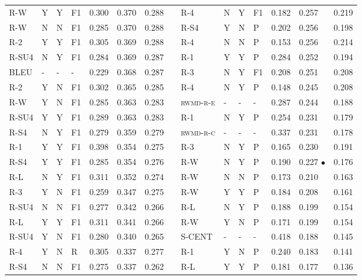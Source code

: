 \documentclass[11pt,a4paper]{article}
\begin{document}
\begin{table}[]
{\begin{tabular}{lllllllllllllll}
\textsc{R-W} & Y & Y & F1 & 0.300 & 0.370 & 0.288 &  & \textsc{R-4} & N & Y & F1 & 0.182 & 0.257 & 0.219 \\
\textsc{R-W} & N & N & F1 & 0.285 & 0.370 & 0.288 &  & \textsc{R-S4} & Y & N & P & 0.202 & 0.256 & 0.198 \\
\textsc{R-2} & Y & Y & F1 & 0.305 & 0.369 & 0.288 &  & \textsc{R-4} & N & N & P & 0.153 & 0.256 & 0.214 \\
\textsc{R-SU4} & N & Y & F1 & 0.284 & 0.369 & 0.287 &  & \textsc{R-1} & Y & Y & P & 0.284 & 0.252 & 0.194 \\
\textsc{BLEU} & - & - & - & 0.229 & 0.368 & 0.287 &  & \textsc{R-3} & N & Y & F1 & 0.208 & 0.251 & 0.208 \\
\textsc{R-2} & Y & N & F1 & 0.302 & 0.365 & 0.285 &  & \textsc{R-4} & N & Y & P & 0.148 & 0.245 & 0.208 \\
\textsc{R-W} & Y & N & F1 & 0.285 & 0.363 & 0.283 &  & \textsc{rwmd-r-e} & - & - & - & 0.287 & 0.244 & 0.188 \\
\textsc{R-SU4} & Y & Y & F1 & 0.289 & 0.363 & 0.283 &  & \textsc{R-1} & N & Y & P & 0.254 & 0.231 & 0.179 \\
\textsc{R-S4} & N & Y & F1 & 0.279 & 0.359 & 0.279 &  & \textsc{rwmd-r-c} & - & - & - & 0.337 & 0.231 & 0.178 \\
\textsc{R-1} & Y & Y & F1 & 0.398 & 0.354 & 0.275 &  & \textsc{R-3} & N & Y & P & 0.165 & 0.230 & 0.191 \\
\textsc{R-S4} & Y & Y & F1 & 0.285 & 0.354 & 0.276 &  & \textsc{R-W} & N & Y & P & 0.190 & 0.227 $\bullet$ & 0.176 \\
\textsc{R-L} & N & Y & F1 & 0.311 & 0.352 & 0.274 &  & \textsc{R-W} & N & N & P & 0.173 & 0.210 & 0.163 \\
\textsc{R-3} & Y & N & F1 & 0.259 & 0.347 & 0.275 &  & \textsc{R-W} & Y & Y & P & 0.184 & 0.208 & 0.161 \\
\textsc{R-SU4} & N & N & F1 & 0.277 & 0.342 & 0.266 &  & \textsc{R-L} & N & Y & P & 0.188 & 0.199 & 0.154 \\
\textsc{R-L} & Y & Y & F1 & 0.311 & 0.341 & 0.266 &  & \textsc{R-W} & Y & N & P & 0.171 & 0.199 & 0.154 \\
\textsc{R-SU4} & Y & N & F1 & 0.280 & 0.340 & 0.265 &  & \textsc{S-CENT} & - & - & - & 0.418 & 0.188 & 0.145 \\
\textsc{R-4} & Y & N & R & 0.305 & 0.337 & 0.277 &  & \textsc{R-1} & Y & N & P & 0.240 & 0.183 & 0.141 \\
\textsc{R-S4} & N & N & F1 & 0.275 & 0.337 & 0.262 &  & \textsc{R-L} & Y & Y & P & 0.181 & 0.177 & 0.136 \\

\end{tabular}}
\end{table}
\end{document}
